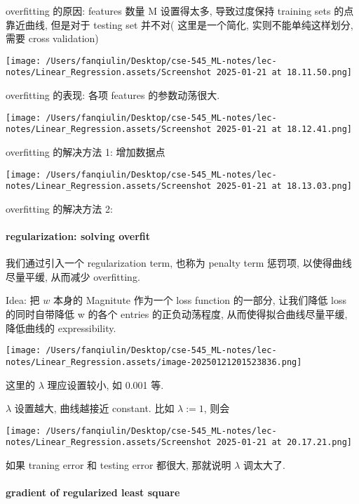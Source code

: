 \documentclass[
]{article}
\begin{document}
overfitting 的原因: features 数量 M 设置得太多, 导致过度保持 training
sets 的点靠近曲线, 但是对于 testing set 并不对( 这里是一个简化,
实则不能单纯这样划分, 需要 cross validation)

\texttt{[image: /Users/fanqiulin/Desktop/cse-545\_ML-notes/lec-notes/Linear\_Regression.assets/Screenshot 2025-01-21 at 18.11.50.png]}

overfitting 的表现: 各项 features 的参数动荡很大.

\texttt{[image: /Users/fanqiulin/Desktop/cse-545\_ML-notes/lec-notes/Linear\_Regression.assets/Screenshot 2025-01-21 at 18.12.41.png]}

overfitting 的解决方法 1: 增加数据点

\texttt{[image: /Users/fanqiulin/Desktop/cse-545\_ML-notes/lec-notes/Linear\_Regression.assets/Screenshot 2025-01-21 at 18.13.03.png]}

overfitting 的解决方法 2:

\hypertarget{regularization-solving-overfit}{%
\paragraph{regularization: solving
overfit}\label{regularization-solving-overfit}}

我们通过引入一个 regularization term, 也称为 penalty term 惩罚项,
以使得曲线尽量平缓, 从而减少 overfitting.

Idea: 把 \(w\) 本身的 Magnitute 作为一个 loss function 的一部分,
让我们降低 loss 的同时自带降低 w 的各个 entries 的正负动荡程度,
从而使得拟合曲线尽量平缓, 降低曲线的 expressibility.

\texttt{[image: /Users/fanqiulin/Desktop/cse-545\_ML-notes/lec-notes/Linear\_Regression.assets/image-20250121201523836.png]}

这里的 \(\lambda\) 理应设置较小, 如 0.001 等.

\(\lambda\) 设置越大, 曲线越接近 constant. 比如 \(\lambda := 1\), 则会

\texttt{[image: /Users/fanqiulin/Desktop/cse-545\_ML-notes/lec-notes/Linear\_Regression.assets/Screenshot 2025-01-21 at 20.17.21.png]}

如果 traning error 和 testing error 都很大, 那就说明 \(\lambda\)
调太大了.

\hypertarget{gradient-of-regularized-least-square}{%
\paragraph{gradient of regularized least
square}\label{gradient-of-regularized-least-square}}
\end{document}
